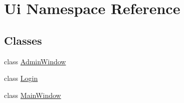 \hypertarget{namespace_ui}{}\section{Ui Namespace Reference}
\label{namespace_ui}
\subsection*{Classes}
\begin{DoxyCompactItemize}
\item 
class \hyperlink{class_ui_1_1_admin_window}{Admin\+Window}
\item 
class \hyperlink{class_ui_1_1_login}{Login}
\item 
class \hyperlink{class_ui_1_1_main_window}{Main\+Window}
\end{DoxyCompactItemize}
